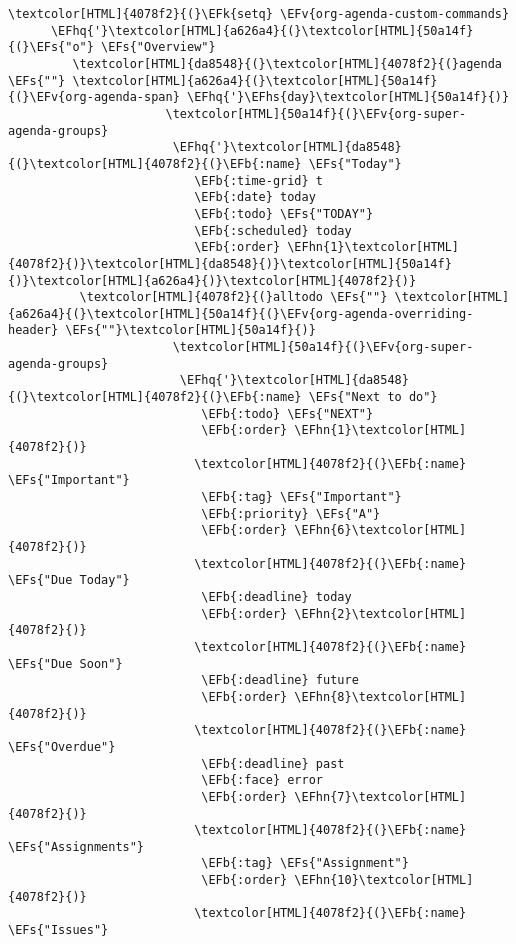\documentclass{scrartcl}
\newcommand{\EFk}[1]{\textcolor{EFk}{#1}} %
\newcommand{\EFs}[1]{\textcolor{EFs}{#1}} %
\newcommand{\EFb}[1]{\textcolor{EFb}{#1}} %
\newcommand{\EFv}[1]{\textcolor{EFv}{#1}} %
\newcommand{\EFhn}[1]{\textcolor{EFhn}{\textbf{#1}}} %
\newcommand{\EFhq}[1]{\textcolor{EFhq}{#1}} %
\newcommand{\EFhs}[1]{\textcolor{EFhs}{#1}} %
\begin{document}
\begin{Code}
\begin{Verbatim}[]
\textcolor[HTML]{4078f2}{(}\EFk{setq} \EFv{org-agenda-custom-commands}
      \EFhq{'}\textcolor[HTML]{a626a4}{(}\textcolor[HTML]{50a14f}{(}\EFs{"o"} \EFs{"Overview"}
         \textcolor[HTML]{da8548}{(}\textcolor[HTML]{4078f2}{(}agenda \EFs{""} \textcolor[HTML]{a626a4}{(}\textcolor[HTML]{50a14f}{(}\EFv{org-agenda-span} \EFhq{'}\EFhs{day}\textcolor[HTML]{50a14f}{)}
                      \textcolor[HTML]{50a14f}{(}\EFv{org-super-agenda-groups}
                       \EFhq{'}\textcolor[HTML]{da8548}{(}\textcolor[HTML]{4078f2}{(}\EFb{:name} \EFs{"Today"}
                          \EFb{:time-grid} t
                          \EFb{:date} today
                          \EFb{:todo} \EFs{"TODAY"}
                          \EFb{:scheduled} today
                          \EFb{:order} \EFhn{1}\textcolor[HTML]{4078f2}{)}\textcolor[HTML]{da8548}{)}\textcolor[HTML]{50a14f}{)}\textcolor[HTML]{a626a4}{)}\textcolor[HTML]{4078f2}{)}
          \textcolor[HTML]{4078f2}{(}alltodo \EFs{""} \textcolor[HTML]{a626a4}{(}\textcolor[HTML]{50a14f}{(}\EFv{org-agenda-overriding-header} \EFs{""}\textcolor[HTML]{50a14f}{)}
                       \textcolor[HTML]{50a14f}{(}\EFv{org-super-agenda-groups}
                        \EFhq{'}\textcolor[HTML]{da8548}{(}\textcolor[HTML]{4078f2}{(}\EFb{:name} \EFs{"Next to do"}
                           \EFb{:todo} \EFs{"NEXT"}
                           \EFb{:order} \EFhn{1}\textcolor[HTML]{4078f2}{)}
                          \textcolor[HTML]{4078f2}{(}\EFb{:name} \EFs{"Important"}
                           \EFb{:tag} \EFs{"Important"}
                           \EFb{:priority} \EFs{"A"}
                           \EFb{:order} \EFhn{6}\textcolor[HTML]{4078f2}{)}
                          \textcolor[HTML]{4078f2}{(}\EFb{:name} \EFs{"Due Today"}
                           \EFb{:deadline} today
                           \EFb{:order} \EFhn{2}\textcolor[HTML]{4078f2}{)}
                          \textcolor[HTML]{4078f2}{(}\EFb{:name} \EFs{"Due Soon"}
                           \EFb{:deadline} future
                           \EFb{:order} \EFhn{8}\textcolor[HTML]{4078f2}{)}
                          \textcolor[HTML]{4078f2}{(}\EFb{:name} \EFs{"Overdue"}
                           \EFb{:deadline} past
                           \EFb{:face} error
                           \EFb{:order} \EFhn{7}\textcolor[HTML]{4078f2}{)}
                          \textcolor[HTML]{4078f2}{(}\EFb{:name} \EFs{"Assignments"}
                           \EFb{:tag} \EFs{"Assignment"}
                           \EFb{:order} \EFhn{10}\textcolor[HTML]{4078f2}{)}
                          \textcolor[HTML]{4078f2}{(}\EFb{:name} \EFs{"Issues"}

\end{Verbatim}
\end{Code}
\end{document}
